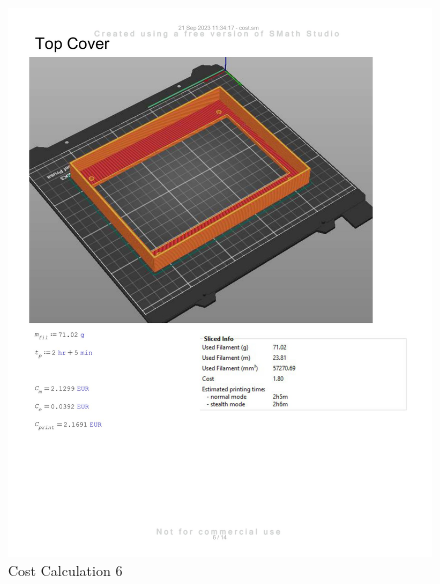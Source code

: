 \begin{figure}[H]
    \centering
    \includegraphics[width=\linewidth]{texs/appendix/data/cost1-06.jpg}
    \caption{Cost Calculation 6}
    \label{fig:cost-calculation-6}
\end{figure}

